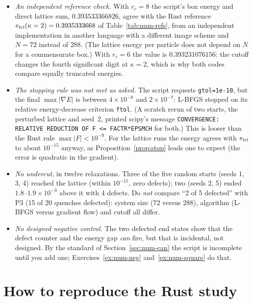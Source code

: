\begin{itemize}
\item \emph{An independent reference check.} With $r_c=8$ the script's box energy and direct lattice sum,
$0.393533366826$, agree with the Rust reference $e_{\rm tri}(\kappa=2)=0.3935333668$ of Table~\ref{tab:num-refs}, from
an independent implementation in another language with a different image scheme and $N=72$ instead of $288$. (The
lattice energy per particle does not depend on $N$ for a commensurate box.) With $r_c=6$ the value is
$0.393231076156$: the cutoff changes the fourth significant digit at $\kappa=2$, which is why both codes compare
equally truncated energies.
\item \emph{The stopping rule was not met as asked.} The script requests \texttt{gtol=1e-10}, but the final
$\max|\nabla E|$ is between $4\times10^{-8}$ and $2\times10^{-7}$: L-BFGS stopped on its relative energy-decrease
criterion \texttt{ftol}. (A scratch rerun of two starts, the perturbed lattice and seed~2, printed scipy's message
\texttt{CONVERGENCE: RELATIVE REDUCTION OF F <= FACTR*EPSMCH} for both.) This is looser than the Rust rule $\max|F|<10^{-9}$. For the lattice runs the energy agrees with
$e_{\rm tri}$ to about $10^{-15}$ anyway, as Proposition~\ref{prop:stop} leads one to expect (the error is quadratic in
the gradient).
\item \emph{No undercut}, in twelve relaxations. Three of the five random starts (seeds 1, 3, 4) reached the
lattice (within $10^{-15}$, zero defects); two (seeds 2, 5) ended $1.8$--$1.9\times10^{-3}$ above it with 4 defects. Do
\emph{not} compare ``2 of 5 defected'' with P3 (15 of 20 quenches defected): system size ($72$ versus $288$), algorithm (L-BFGS versus gradient
flow) and cutoff all differ.
\item \emph{No designed negative control.} The two defected end states show that the defect counter and the energy gap
\emph{can} fire, but that is incidental, not designed. By the standard of Section~\ref{sec:num-can} the script is
incomplete until you add one; Exercises~\ref{ex:num-neg} and~\ref{ex:num-square} do that.
\end{itemize}

\section{How to reproduce the Rust study}\label{sec:num-repro}

